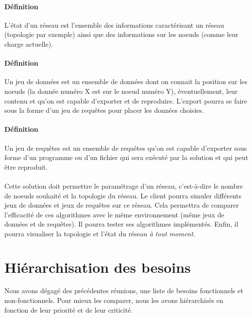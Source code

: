 \documentclass[12pt]{article}
\begin{document}
\paragraph{Définition} L'état d'un réseau est l'ensemble des informations caractérisant un réseau (topologie par exemple) ainsi que des informations sur les noeuds (comme leur charge actuelle).

\paragraph{Définition} Un jeu de données est un ensemble de données dont on connait la position sur les noeuds (la donnée numéro X est sur le noeud numéro Y), éventuellement, leur contenu et qu'on est capable d'exporter et de reproduire. L'export pourra se faire sous la forme d'un jeu de requêtes pour placer les données choisies.

\paragraph{Définition} Un jeu de requêtes est un ensemble de requêtes qu'on est capable d'exporter sous forme d'un programme ou d'un fichier qui sera exécuté par la solution et qui peut être reproduit.

\paragraph{}Cette solution doit permettre le paramétrage d'un réseau, c'est-à-dire le nombre de noeuds souhaité et la topologie du réseau.
Le client pourra simuler différents jeux de données et jeux de requêtes sur ce réseau. Cela permettra de comparer l'efficacité de ces algorithmes avec le même environnement (même jeux de données et de requêtes).
Il pourra tester ses algorithmes implémentés.
Enfin, il pourra visualiser la topologie et l'état du réseau \textit{à tout moment}.




\section{Hiérarchisation des besoins}

\paragraph{} Nous avons dégagé des précédentes réunions, une liste de besoins fonctionnels et non-fonctionnels. 
Pour mieux les comparer, nous les avons hiérarchisés en fonction de leur priorité et de leur criticité.
\end{document}
